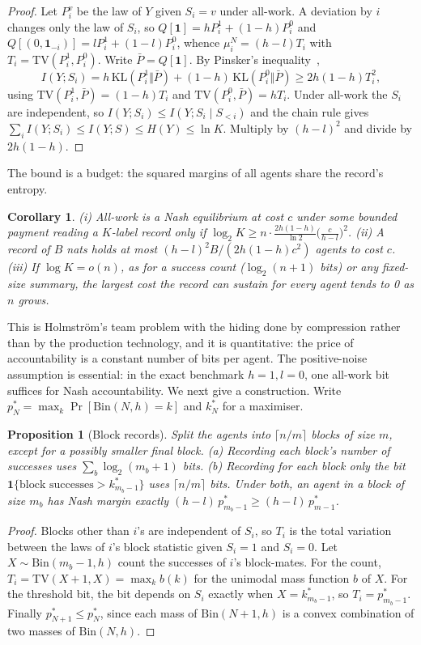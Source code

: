 \documentclass[sigconf,anonymous,acmthm=false]{aamas}
\theoremstyle{acmplain}
\newtheorem{proposition}{Proposition}
\newtheorem{corollary}{Corollary}
\theoremstyle{acmdefinition}
\newcommand{\TV}{\mathrm{TV}}
\begin{document}
\begin{proof}
Let $P_i^v$ be the law of $Y$ given $S_i=v$ under all-work. A deviation by $i$ changes only
the law of $S_i$, so $Q[\mathbf1]=hP_i^1+(1-h)P_i^0$ and
$Q[(0,\mathbf1_{-i})]=lP_i^1+(1-l)P_i^0$, whence $\mu_i^N=(h-l)T_i$ with
$T_i=\TV(P_i^1,P_i^0)$. Write $\bar P=Q[\mathbf1]$. By Pinsker's inequality~\cite{cover2006},
\[ I(Y;S_i)=h\,\mathrm{KL}(P_i^1\Vert\bar P)+(1-h)\,\mathrm{KL}(P_i^0\Vert\bar P)\ge2h(1-h)T_i^2, \]
using $\TV(P_i^1,\bar P)=(1-h)T_i$ and $\TV(P_i^0,\bar P)=hT_i$. Under all-work the $S_i$ are
independent, so $I(Y;S_i)\le I(Y;S_i\mid S_{<i})$ and the chain rule gives
$\sum_iI(Y;S_i)\le I(Y;S)\le H(Y)\le\ln K$. Multiply by $(h-l)^2$ and divide by $2h(1-h)$.
\end{proof}

The bound is a budget: the squared margins of all agents share the record's entropy.

\begin{corollary}\label{cor:noisy}
(i) All-work is a Nash equilibrium at cost $c$ under some bounded payment reading a $K$-label
record only if $\log_2K\ge n\cdot\frac{2h(1-h)}{\ln2}\big(\frac c{h-l}\big)^2$. (ii) A record
of $B$ nats holds at most $(h-l)^2B/(2h(1-h)c^2)$ agents to cost $c$. (iii) If $\log K=o(n)$,
as for a success count ($\log_2(n+1)$ bits) or any fixed-size summary, the largest cost the
record can sustain for every agent tends to 0 as $n$ grows.
\end{corollary}

This is Holmstr\"om's team problem with the hiding done by compression rather than by the
production technology, and it is quantitative: the price of accountability is a constant
number of bits per agent. The positive-noise assumption is essential: in the exact benchmark $h=1,l=0$,
one all-work bit suffices for Nash accountability. We next give a construction. Write
$p^*_N=\max_k\Pr[\mathrm{Bin}(N,h)=k]$ and $k^*_N$ for a maximiser.

\begin{proposition}[Block records]\label{prop:blocks}
Split the agents into $\lceil n/m\rceil$ blocks of size $m$, except for a possibly
smaller final block. (a) Recording each block's number of
successes uses $\sum_b\log_2(m_b+1)$ bits. (b) Recording for each block only the bit
$\mathbf1\{\text{block successes}>k^*_{m_b-1}\}$ uses $\lceil n/m\rceil$ bits. Under both, an
agent in a block of size $m_b$ has Nash margin exactly $(h-l)\,p^*_{m_b-1}\ge(h-l)\,p^*_{m-1}$.
\end{proposition}
\begin{proof}
Blocks other than $i$'s are independent of $S_i$, so $T_i$ is the total variation between the
laws of $i$'s block statistic given $S_i=1$ and $S_i=0$. Let $X\sim\mathrm{Bin}(m_b-1,h)$
count the successes of $i$'s block-mates. For the count, $T_i=\TV(X+1,X)=\max_kb(k)$ for the
unimodal mass function $b$ of $X$. For the threshold bit, the bit depends on $S_i$ exactly
when $X=k^*_{m_b-1}$, so $T_i=p^*_{m_b-1}$. Finally $p^*_{N+1}\le p^*_N$, since each mass of
$\mathrm{Bin}(N+1,h)$ is a convex combination of two masses of $\mathrm{Bin}(N,h)$.
\end{proof}
\end{document}
